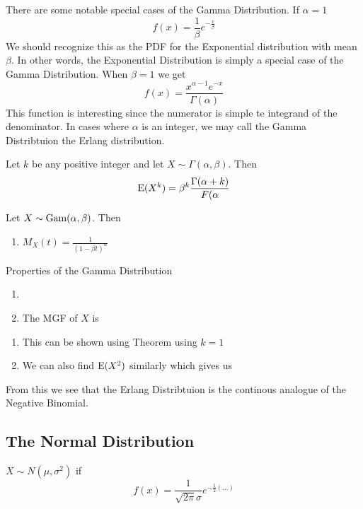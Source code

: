 There are some notable special cases of the Gamma Distribution. If $\alpha = 1 $
\[
    f(x)=\frac 1\beta e^{-\frac x \beta}
\]
We should recognize this as the PDF for the Exponential distribution with mean $\beta$. In other words, the Exponential Distribution is simply a special case of the Gamma Distribution. When $\beta=1$ we get
\[
    f(x)=\frac{x^{\alpha-1}e^{-x}}{\Gamma(\alpha)}
\]
This function is interesting since the numerator is simple te integrand of the denominator. In cases where $\alpha$ is an integer, we may call the Gamma Distribtuion the Erlang distribution.
\begin{theorem}
    Let $k$ be any positive integer and let $X\sim \Gamma(\alpha,\beta)$. Then
    \[
        \textup{E}(X^k)=\beta^k \frac{\Gamma(\alpha+k)}{F(\alpha}
    \]
    
\end{theorem}

\begin{theorem}
Let $X\sim\textup{Gam}(\alpha,\beta)$. Then
\begin{enumerate}
    \item $M_X(t)=\frac 1 {(1-\beta t)^\alpha}$
\end{enumerate}
    
\end{theorem}

\begin{theorem}
    {Properties of the Gamma Distribution}
    \begin{enumerate}
        \item[]
        \item The MGF of $X$ is 
    \end{enumerate}
    \begin{enumerate}
        \item This can be shown using Theorem \todo using $k=1$
        \item We can also find $\textup{E}(X^2)$ similarly which gives us
    \end{enumerate}
\end{theorem}

From this we see that the Erlang Distribtuion is the continous analogue of the Negative Binomial.



\subsection{The Normal Distribution}
$X\sim N(\mu,\sigma^2)$ if
\[
    f(x)=\frac 1 {\sqrt{2\pi}\sigma}e^{-\frac 12 (...)}
\]

